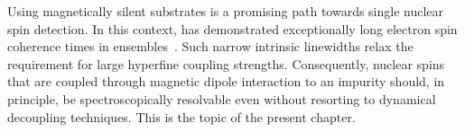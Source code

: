 Using magnetically silent substrates is a promising path towards single nuclear spin detection. In this context, \Ca has demonstrated exceptionally long electron spin coherence times in ensembles~. Such narrow intrinsic linewidths relax the requirement for large hyperfine coupling strengths. Consequently, \W nuclear spins that are coupled through magnetic dipole interaction to an \Er impurity should, in principle, be spectroscopically resolvable even without resorting to dynamical decoupling techniques. This is the topic of the present chapter.



